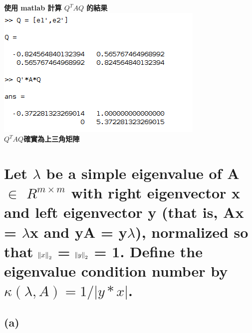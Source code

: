 \documentclass[12pt]{article}
\begin{document}
    \textbf{使用 matlab 計算 $Q^TAQ$ 的結果}\\
    \includegraphics[scale=1]{schur.png}\\
    \textbf{$Q^TAQ$確實為上三角矩陣}
\section{Let $\lambda$ be a simple eigenvalue of A $\in$ $R^{m \times m}$ with right eigenvector x and left
eigenvector y (that is, Ax = $\lambda$x and yA = y$\lambda$), normalized so that $\norm{x}_2$ = $\norm{y}_2$ = 1. Define the eigenvalue condition number by $\kappa(\lambda, A) = 1/|y*x|$.}
\subsection*{(a)}
\end{document}

